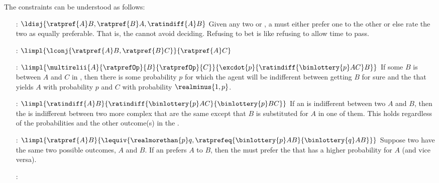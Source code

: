 \documentclass[notes,mh]{mikoslides}
\begin{document}
\begin{module}[id=rational-preferences]
\begin{nomtext}
  The  constraints can be understood as follows:
  \begin{enumerate}
  \item[{\Trefi[rational-preferences]{orderability}:}]
    $\ldisj{\ratpref{A}B,\ratpref{B}A,\ratindiff{A}B}$ Given any two
     or , a
      must either prefer one to the
    other or else rate the two as equally preferable. That is, the 
    cannot avoid deciding. Refusing to bet is like refusing to allow time to pass.
  \item[{\Trefi[rational-preferences]{transitivity}:}] $\limpl{\lconj{\ratpref{A}B,\ratpref{B}C}}{\ratpref{A}C}$
  \item[{\Trefi[rational-preferences]{continuity}:}]
    $\limpl{\multirelii{A}{\ratprefOp}{B}{\ratprefOp}{C}}{\excdot{p}{\ratindiff{\binlottery{p}AC}B}}$
    If some  $B$ is between $A$ and $C$ in
    , then there is some probability $p$ for which the
     agent will be indifferent between getting $B$ for sure
    and the  that yields $A$ with probability $p$ and $C$ with
    probability $\realminus{1,p}$.
  \item[{\Trefi[rational-preferences]{substitutability}:}]
    $\limpl{\ratindiff{A}B}{\ratindiff{\binlottery{p}AC}{\binlottery{p}BC}}$ If an 
    is indifferent between two  $A$ and $B$, then the  is indifferent
    between two more complex  that are the same except that $B$ is substituted
    for $A$ in one of them. This holds regardless of the probabilities and the other
    outcome(s) in the .
  \item[{\Trefi[rational-preferences]{monotonicity}:}]
    $\limpl{\ratpref{A}B}{\lequiv{\realmorethan{p}q,\ratprefeq{\binlottery{p}AB}{\binlottery{q}AB}}}$
    Suppose two  have the same two possible outcomes, $A$ and $B$. If an 
    prefers $A$ to $B$, then the  must prefer the  that
    has a higher probability for $A$ (and vice versa).
  \item[{\Trefi[rational-preferences]{decomposability}:}]

\end{enumerate}
\end{nomtext}
\end{module}
\end{document}
